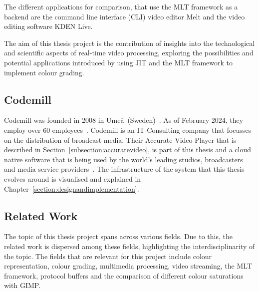 \documentclass[../MasterThesis.tex]{subfiles}
\begin{document}
	The different applications for comparison, that use the MLT framework as a backend are the command line interface (CLI) video editor Melt and the video editing software KDEN Live. 
	
	
	The aim of this thesis project is the contribution of insights into the technological and scientific aspects of real-time video processing, exploring the possibilities and potential applications introduced by using JIT and the MLT framework to implement colour grading. 
	
	

	
	
	
	
\newpage	
	\subsection{Codemill} \label{subsection:codemill}
	
	Codemill was founded in 2008 in Ume\aa \ (Sweden)~\cite{codemill_now, codemill_old}.
	As of February 2024, they employ over 60 employees~\cite{codemill}. 
	Codemill is an IT-Consulting company that focusses on the distribution of broadcast media. Their Accurate Video Player that is described in Section~\ref{subsection:accuratevideo}, is part of this thesis and a cloud native software that is being used by the world's leading studios, broadcasters and media service providers~\cite{codemill_linkedin, codemill_avp}.
	The infrastructure of the system that this thesis evolves around is visualised and explained in Chapter~\ref{section:designandimplementation}.
	
	
	
	
	
	
	
	
	
	
	
	
	\subsection{Related Work} \label{subsection:relatedwork}
	
	The topic of this thesis project spans across various fields. 
	Due to this, the related work is dispersed among these fields, highlighting the interdisciplinarity of the topic.
	The fields that are relevant for this project include colour representation, colour grading, multimedia processing, video streaming, the MLT framework, protocol buffers and the comparison of different colour saturations with GIMP.
\end{document}

